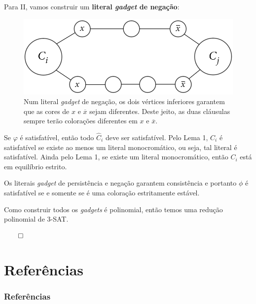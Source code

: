 \documentclass{beamer}
\newcommand{\ov}{\overline}
\theoremstyle{plain}
\newcommand{\gadget}{\textit{gadget}}
\newcommand{\bcolor}[1]{{\color{blue} #1}}
\begin{document}
\begin{frame}
  Para \bcolor{II}, vamos construir um \textbf{literal \gadget{} de negação}:

  \begin{figure}[h]
    \centering\includegraphics[scale=0.3]{imgs/negation.png}
    \captionsetup{justification=raggedright}
    \caption{Num literal \gadget{} de negação, os dois vértices inferiores garantem que as cores
    de $x$ e $\ov{x}$ sejam diferentes. Deste jeito, as duas cláusulas sempre terão colorações
    diferentes em $x$ e $\ov{x}$.}
  \end{figure}
\end{frame}

\begin{frame}

  {\color{blue}{5.}}

  Se $\varphi$ é satisfatível, então todo $\hat{C}_i$ deve ser satisfatível. Pelo Lema 1, $C_i$ é
  satisfatível se existe ao menos um literal monocromático, ou seja, tal literal é satisfatível.
  Ainda pelo Lema 1, se existe um literal monocromático, então $C_i$ está em equilíbrio estrito.

  Os literais \gadget{} de persistência e negação garantem consistência e portanto $\phi$ é
  satisfatível se e somente se é uma coloração estritamente estável.

  Como construir todos os \textit{gadgets} é polinomial, então temos uma redução polinomial de
  3-SAT\@.

  \hfill{}$\qed$
\end{frame}


\section[Referências]{Referências}
\begin{frame}[t,allowframebreaks]
  \frametitle{Referências}
  \nocite{*}
  \printbibliography[]
\end{frame}
\end{document}
